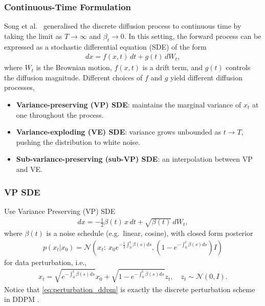 \documentclass[a4paper,12pt]{article}
\begin{document}
\subsubsection{Continuous-Time Formulation}
Song et al.~\cite{song2021ScoreBasedGenerativeModeling} generalised the discrete diffusion process to continuous time by taking the limit as \(T \to \infty\) and \(\beta_t \to 0\). In this setting, the forward process can be expressed as a stochastic differential equation (SDE) of the form
\begin{align}\label{eq:forward_sde}
    dx = f(x,t)\,dt + g(t)\,dW_t,
\end{align}
where \(W_t\) is the Brownian motion, \(f(x,t)\) is a drift term, and \(g(t)\) controls the diffusion magnitude. Different choices of \(f\) and \(g\) yield different diffusion processes,
\begin{itemize}
    \item \textbf{Variance-preserving (VP) SDE}: maintains the marginal variance of \(x_t\) at one throughout the process.  
    \item \textbf{Variance-exploding (VE) SDE}: variance grows unbounded as \(t \to T\), pushing the distribution to white noise.  
    \item \textbf{Sub-variance-preserving (sub-VP) SDE}: an interpolation between VP and VE.  
\end{itemize}
\subsubsection{VP SDE}
Use Variance Preserving (VP) SDE \cite{song2021ScoreBasedGenerativeModeling}
\begin{align}\label{eq:VPSDE}
    dx = -\frac{1}{2}\beta(t)\,x\,dt + \sqrt{\beta(t)}\,dW_t,
\end{align}
where \(\beta(t)\) is a noise schedule (e.g.~linear, cosine), with closed form posterior
\begin{align*}
    p\left(x_t|x_0\right)=\mathcal{N}\left(x_t:\:x_0e^{-\frac{1}{2}\int_0^t\beta(s)ds},\left(1-e^{-\int_0^t\beta(s)ds}\right)I\right)
\end{align*}
for data perturbation, i.e.,
\begin{align}\label{eq:perturbation_ddpm}
    x_t=\sqrt{e^{-\int_0^t\beta(s)ds}}x_0+\sqrt{1-e^{-\int_0^t\beta(s)ds}}z_t,\quad z_t\sim\mathcal{N}\left(0, I\right).
\end{align}
Notice that \cref{eq:perturbation_ddpm} is exactly the discrete perturbation scheme in DDPM \cite{hoDenoisingDiffusionProbabilistic2020}.
\end{document}
